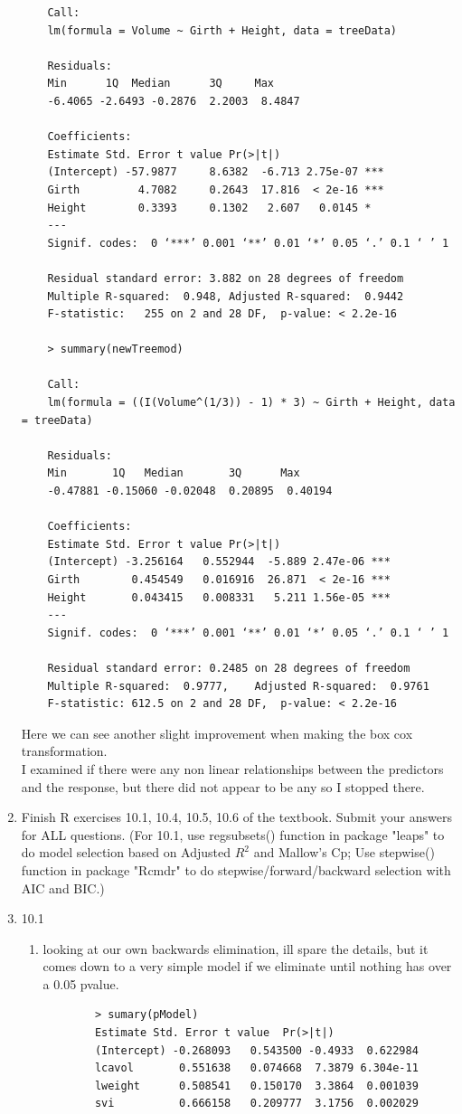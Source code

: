 \documentclass[11pt]{article}
\begin{document}
\begin{enumerate}
\begin{verbatim}
	Call:
	lm(formula = Volume ~ Girth + Height, data = treeData)
	
	Residuals:
	Min      1Q  Median      3Q     Max 
	-6.4065 -2.6493 -0.2876  2.2003  8.4847 
	
	Coefficients:
	Estimate Std. Error t value Pr(>|t|)    
	(Intercept) -57.9877     8.6382  -6.713 2.75e-07 ***
	Girth         4.7082     0.2643  17.816  < 2e-16 ***
	Height        0.3393     0.1302   2.607   0.0145 *  
	---
	Signif. codes:  0 ‘***’ 0.001 ‘**’ 0.01 ‘*’ 0.05 ‘.’ 0.1 ‘ ’ 1
	
	Residual standard error: 3.882 on 28 degrees of freedom
	Multiple R-squared:  0.948,	Adjusted R-squared:  0.9442 
	F-statistic:   255 on 2 and 28 DF,  p-value: < 2.2e-16
	
	> summary(newTreemod)
	
	Call:
	lm(formula = ((I(Volume^(1/3)) - 1) * 3) ~ Girth + Height, data = treeData)
	
	Residuals:
	Min       1Q   Median       3Q      Max 
	-0.47881 -0.15060 -0.02048  0.20895  0.40194 
	
	Coefficients:
	Estimate Std. Error t value Pr(>|t|)    
	(Intercept) -3.256164   0.552944  -5.889 2.47e-06 ***
	Girth        0.454549   0.016916  26.871  < 2e-16 ***
	Height       0.043415   0.008331   5.211 1.56e-05 ***
	---
	Signif. codes:  0 ‘***’ 0.001 ‘**’ 0.01 ‘*’ 0.05 ‘.’ 0.1 ‘ ’ 1
	
	Residual standard error: 0.2485 on 28 degrees of freedom
	Multiple R-squared:  0.9777,	Adjusted R-squared:  0.9761 
	F-statistic: 612.5 on 2 and 28 DF,  p-value: < 2.2e-16
\end{verbatim}

Here we can see another slight improvement when making the box cox transformation.
\\
I examined if there were any non linear relationships between the predictors and the response, but there did not appear to be any so I stopped there.

\item  Finish R exercises 10.1, 10.4, 10.5, 10.6 of the textbook. Submit your
answers for {\color{red}ALL} questions. (For 10.1, use regsubsets() function in package "leaps" to do model selection based on Adjusted $R^2$ and Mallow's Cp; Use stepwise() function in package "Rcmdr" to do stepwise/forward/backward selection with  AIC and BIC.)
\item 10.1
\begin{enumerate}
	\item looking at our own backwards elimination, ill spare the details, but it comes down to a very simple model if we eliminate until nothing has over a 0.05 pvalue.
	\begin{verbatim}
		> sumary(pModel)
		Estimate Std. Error t value  Pr(>|t|)
		(Intercept) -0.268093   0.543500 -0.4933  0.622984
		lcavol       0.551638   0.074668  7.3879 6.304e-11
		lweight      0.508541   0.150170  3.3864  0.001039
		svi          0.666158   0.209777  3.1756  0.002029
		

\end{verbatim}
\end{enumerate}
\end{enumerate}
\end{document}
